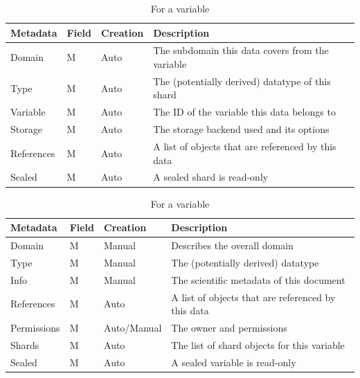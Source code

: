 \documentclass{../../template/esiwace-report}
\begin{document}
\begin{table}
\begin{subtable}[t]{\textwidth}
\begin{tabular}{llll}
Metadata & Field & Creation & Description\\
\hline
Domain   & M & Auto & The subdomain this data covers from the variable\\
Type     & M & Auto & The (potentially derived) datatype of this shard\\
Variable & M & Auto & The ID of the variable this data belongs to\\
Storage  & M & Auto & The storage backend used and its options\\
References & M & Auto & A list of objects that are referenced by this data\\
Sealed   & M & Auto & A sealed shard is read-only\\
\end{tabular}
\caption{For a shard}
\end{subtable}

\begin{subtable}[t]{\textwidth}
\begin{tabular}{llll}
Metadata & Field & Creation & Description\\
\hline
Domain      & M & Manual & Describes the overall domain\\
Type   	    & M & Manual & The (potentially derived) datatype\\
Info   	    & M & Manual & The scientific metadata of this document\\
References  & M & Auto & A list of objects that are referenced by this data\\
Permissions & M & Auto/Manual & The owner and permissions \\
Shards      & M & Auto & The list of shard objects for this variable\\
Sealed      & M & Auto & A sealed variable is read-only\\
\end{tabular}
\caption{For a variable}
\end{subtable}


\end{table}
\end{document}
